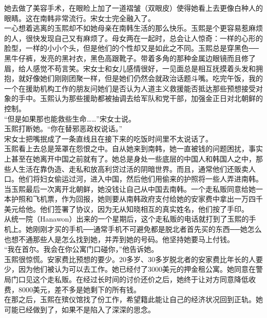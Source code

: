 她去做了美容手术，在眼睑上加了一道褶皱（双眼皮）使得她看上去更像白种人的眼睛。这在南韩非常流行。宋女士完全融入了。\\

一心想着逃离的玉熙却不如她母亲在南韩生活的那么快乐。玉熙是个更容易惹麻烦的人，很快发现自己又有麻烦了。母女两在一起时，总会让人惊奇：一样的心形的脸型，一样的小小个头，但是他们的个性却又是如此之不同。玉熙总是穿黑色──黑牛仔裤，发亮的黑衬衣，黑色高跟靴子。带着多角的那种金属边眼镜而且修了眉，给人感觉不苟言笑。宋女士和女儿感情很好，一见面总是相互抚摸着头发和拥抱，就好像她们刚刚团聚一样，但是她们仍然会就政治话题斗嘴。吃完午饭，我的一个在援助机构工作的朋友问她们是否认为人道主义救援能否抵达那些预想接受对象的手中。玉熙认为那些援助都被抽调去给军队和党干部，加强金正日对北朝鲜的控制。\\

“但是如果那也能救些生命……”宋女士说。\\

玉熙打断她。“你在替邪恶政权说话。”\\

宋女士把嘴抿成了一条直线且在接下来的吃饭时间里不太说话了。\\

玉熙看上去总是笼罩在怨恨之中。自从她来到南韩，她一直被钱的问题困扰，事实上甚至在她离开中国之前就有了。她总是身处一些底层的中国人和韩国人之中，那些人生活在靠伪造、走私和放高利贷过活的阴暗世界。而且，通常他们还贩卖人口。他们将妇女偷运过河，进入中国，然后他们用偷来的护照将一些人弄进南韩。当玉熙最后一次离开北朝鲜，她没钱让自己从中国去南韩。一个走私贩同意给她一本护照和飞机票，作为回报，她则要从南韩政府支付给她的安家费中拿出一万四千美元给他。他们签署了协议，因为无从知晓相互的真实姓名，他们按了手印。\\

从统一院（Hanawon）出来的一个星期后，这个走私贩的电话就打到了玉熙的手机上。她刚刚才买的手机──通常手机不可避免都是脱北者首先买的东西──她怎么也想不通那些人是怎么找到她，并弄到她的号码。他坚持她要马上付钱。\\

“我在首尔。我会在你公寓门口碰你，”他告诉她。\\

玉熙很惊慌。安家费比预想的要少。20多岁、30多岁脱北者的安家费比年长的人要少，因为他们被认为可以去工作。她已经付了3000美元的押金租公寓。她同意在警局门口见这个走私贩。在经过长时间的讨价还价之后，她终于让对方同意降低收费，8000美元，差不多是她剩下的所有钱。\\

在那之后，玉熙在殡仪馆找了份工作，希望籍此能让自己的经济状况回到正轨。她可能已经做到了，如果不是陷入了深深的思念。\\

